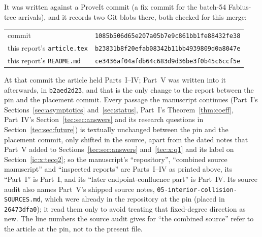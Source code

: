 \documentclass[11pt,a4paper]{article}
\numberwithin{equation}{section}
\theoremstyle{definition}
\theoremstyle{remark}
\begin{document}
It was written against a ProveIt commit (a fix commit for the batch-54
Fabius-tree arrivals), and it records two Git blobs there, both checked for
this merge:
\begin{center}\small
\begin{tabular}{@{}ll@{}}
commit & \texttt{1085b506d65e207a05b7e9c861bb1fe88432fe38}\\
this report's \nolinkurl{article.tex} & \texttt{b23831b8f20efab08342b11bb4939809d0a8047e}\\
this report's \nolinkurl{README.md} & \texttt{ce3436af04afdb64c683d9d36be3f0b45c6ccf5e}
\end{tabular}
\end{center}
At that commit the article held Parts~I--IV;
Part~V was written into it afterwards, in \texttt{b2aed2d23}, and that is
the only change to the report between the pin and the placement commit.
Every passage the manuscript continues (Part~I's
Sections~\ref{sec:asymptotics} and~\ref{sec:status}, Part~I's
Theorem~\ref{thm:coeff}, Part~IV's Section~\ref{tec:sec:answers} and its
research questions in Section~\ref{tec:sec:future}) is textually unchanged
between the pin and the placement commit, only shifted in the source, apart
from the dated notes that Part~V added to Sections~\ref{tec:sec:answers}
and~\ref{tec:x:q1} and its label on Section~\ref{ic:x:tecq2}; so
the manuscript's ``repository'', ``combined source manuscript'' and
``inspected reports'' are Parts~I--IV as printed above, its ``Part~I'' is
Part~I, and its ``later endpoint-confluence part'' is Part~IV.  Its source
audit also names Part~V's shipped source notes,
\nolinkurl{05-interior-collision-SOURCES.md}, which were already in the
repository at the pin (placed in \texttt{26473dfa0}); it read them only to
avoid treating that fixed-degree direction as new.  The line numbers the
source audit gives for ``the combined source'' refer to the article at the
pin, not to the present file.
\end{document}
